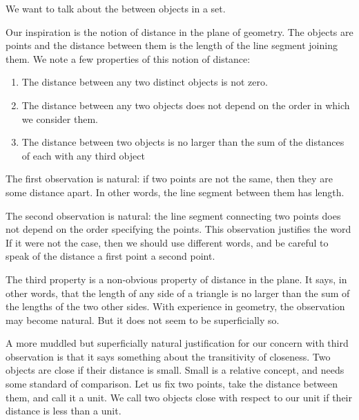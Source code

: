 
\sbasic



\sstart
{}



We want to talk
about the 
between objects in a set.


Our inspiration is the notion
of distance in the plane
of geometry.
The objects
are points and the distance
between them is the length
of the line segment joining
them.
We note a few properties
of this notion of distance:

\begin{enumerate}
  \item
    The distance between any two
    distinct objects is not zero.

  \item
    The distance between any
    two objects does not depend
    on the order in which we
    consider them.

  \item
    The distance between
    two objects is no larger
    than the sum of the distances
    of each with any third object
\end{enumerate}

The first observation
is natural: if two points are not
the same, then they are some
distance apart.
In other words, the line
segment between
them has length.

The second observation is natural:
the line segment connecting
two points does not depend on the
order specifying the points.
This observation
justifies the word
If it were not the case,
then we should use different words,
and be careful to speak
of the distance  a
first point  a second
point.

The third property is
a non-obvious property of
distance in the plane.
It says, in other words,
that the length of any side
of a triangle is no larger than
the sum of the lengths of the
two other sides.
With experience in geometry,
the observation may become
natural. But it does
not seem to be superficially so.

A more muddled but superficially
natural justification for our
concern with third observation
is that it says something
about the transitivity of
closeness.
Two objects are close if
their distance is small.
Small is a relative concept,
and needs some standard of
comparison.
Let us fix two points, take
the distance between them,
and call it a unit.
We call two objects close
with respect to our unit
if their distance is less than a unit.

